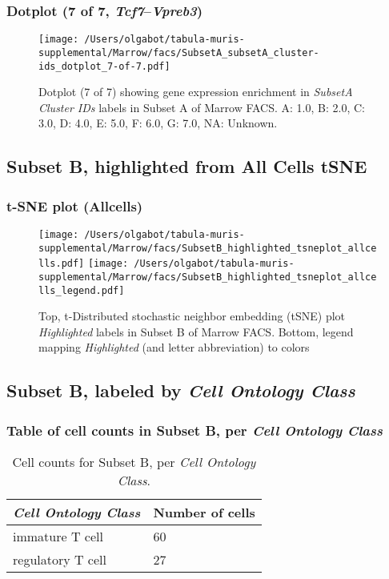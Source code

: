 \clearpage

\subsubsection{Dotplot (7 of 7, \emph{Tcf7}--\emph{Vpreb3})}
\begin{figure}[h]
\centering
\texttt{[image: /Users/olgabot/tabula-muris-supplemental/Marrow/facs/SubsetA\_subsetA\_cluster-ids\_dotplot\_7-of-7.pdf]}

\caption{ Dotplot (7 of 7)  showing gene expression enrichment in \emph{SubsetA Cluster IDs} labels in Subset A of Marrow FACS. A: 1.0, B: 2.0, C: 3.0, D: 4.0, E: 5.0, F: 6.0, G: 7.0, NA: Unknown.}
\end{figure}


\clearpage

\subsection{Subset B, highlighted from All Cells tSNE}

\subsubsection{t-SNE plot (Allcells)}
\begin{figure}[h]
\centering
\texttt{[image: /Users/olgabot/tabula-muris-supplemental/Marrow/facs/SubsetB\_highlighted\_tsneplot\_allcells.pdf]}
\texttt{[image: /Users/olgabot/tabula-muris-supplemental/Marrow/facs/SubsetB\_highlighted\_tsneplot\_allcells\_legend.pdf]}
\caption{Top, t-Distributed stochastic neighbor embedding (tSNE) plot  \emph{Highlighted} labels in Subset B of Marrow FACS. Bottom, legend mapping \emph{Highlighted} (and letter abbreviation) to colors}
\end{figure}


\clearpage

\subsection{Subset B, labeled by \emph{Cell Ontology Class}}
\subsubsection{Table of cell counts in Subset B, per \emph{Cell Ontology Class}}\begin{table}[h]
\centering
\label{my-label}
\begin{tabular}{@{}ll@{}}
\toprule

\emph{Cell Ontology Class}& Number of cells \\ \midrule
immature T cell & 60 \\

regulatory T cell & 27 \\
\bottomrule
\end{tabular}
\caption{Cell counts for Subset B, per \emph{Cell Ontology Class}.}
\end{table}

